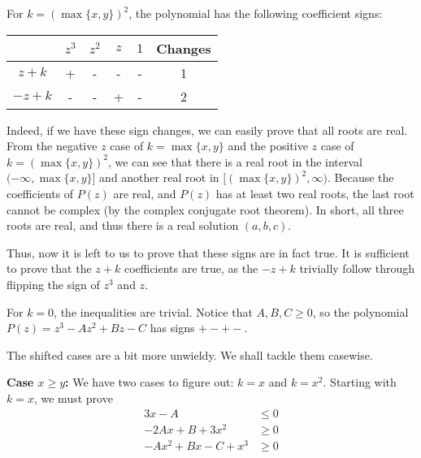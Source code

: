 \begin{solution}{4}
    For \( k = (\max \{ x, y \})^2 \), the polynomial has the following coefficient signs:
    \begin{center}
        \begin{tabular}{c|c|c|c|c|c}
            & \( z^3 \) & \( z^2 \) & \( z \) & \( 1 \) & Changes \\
            \hline
            \( z + k \) & + & - & - & - & 1 \\
            \( -z + k \) & - & - & + & - & 2 
        \end{tabular}
    \end{center}

    Indeed, if we have these sign changes, we can easily prove that all roots
    are real. From the negative \( z \) case of \( k = \max \{x, y \} \) and the positive \( z \) case of \( k = (\max\{x, y\})^2 \), we can see that there is a real root in the interval \( (-\infty, \max\{x, y\}] \) and another real root in \( [(\max\{x, y\})^2, \infty) \). Because the coefficients of \( P(z) \) are real, and \( P(z) \) has at least two real roots, the last root cannot be complex (by the complex conjugate root theorem). In short, all three roots are real, and thus there is a real solution \( (a, b, c) \).

    Thus, now it is left to us to prove that these signs are in fact true. It is sufficient to prove that the \( z + k \) coefficients are true, as the \( -z + k \) trivially follow through flipping the sign of \( z^3 \) and \( z \).

    For \( k = 0 \), the inequalities are trivial. Notice that \( A, B, C \geq 0 \), so the polynomial \( P(z) = z^3 - Az^2 + Bz - C \) has signs \( +-+- \).

    The shifted cases are a bit more unwieldy. We shall tackle them casewise.

    \textbf{Case \( x \geq y \):} We have two cases to figure out: \( k = x \) and \( k = x^2 \). Starting with \( k = x \), we must prove
    \begin{align}
        3x - A &\leq 0 \\
        -2Ax + B + 3x^2 &\geq 0 \\
        -Ax^2 + Bx - C + x^3 &\geq 0
    \end{align}


\end{solution}
